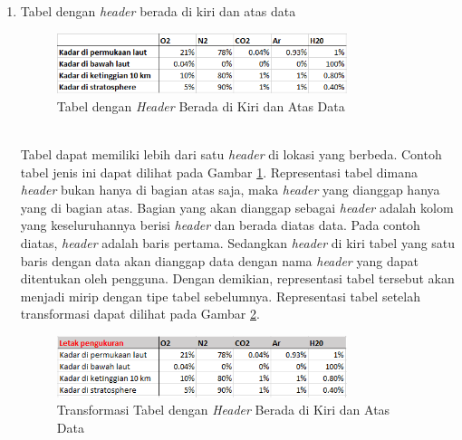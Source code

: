 \begin{enumerate}
	\item Tabel dengan \textit{header} berada di kiri dan atas data
	\begin{figure}[htbp]
	    \centering
	    \includegraphics[width=0.8\textwidth]{resources/chapter-3-tabletype-2.png}
	    \caption{Tabel dengan \textit{Header} Berada di Kiri dan Atas Data}
		\label{TabelTipe2}
	\end{figure}\\
	Tabel dapat memiliki lebih dari satu \textit{header} di lokasi yang berbeda. Contoh tabel jenis ini dapat dilihat pada Gambar \ref{TabelTipe2}. Representasi tabel dimana \textit{header} bukan hanya di bagian atas saja, maka \textit{header} yang dianggap hanya yang di bagian atas. Bagian yang akan dianggap sebagai \textit{header} adalah kolom yang keseluruhannya berisi \textit{header} dan berada diatas data. Pada contoh diatas, \textit{header} adalah baris pertama. Sedangkan \textit{header} di kiri tabel yang satu baris dengan data akan dianggap data dengan nama \textit{header} yang dapat ditentukan oleh pengguna. Dengan demikian, representasi tabel tersebut akan menjadi mirip dengan tipe tabel sebelumnya. Representasi tabel setelah transformasi dapat dilihat pada Gambar \ref{TabelTipe2T}.\\
	\begin{figure}[htbp]
	    \centering
	    \includegraphics[width=0.8\textwidth]{resources/chapter-3-tabletype-2-transformed.png}
	    \caption{Transformasi Tabel dengan \textit{Header} Berada di Kiri dan Atas Data}
		\label{TabelTipe2T}
	\end{figure}


\end{enumerate}
